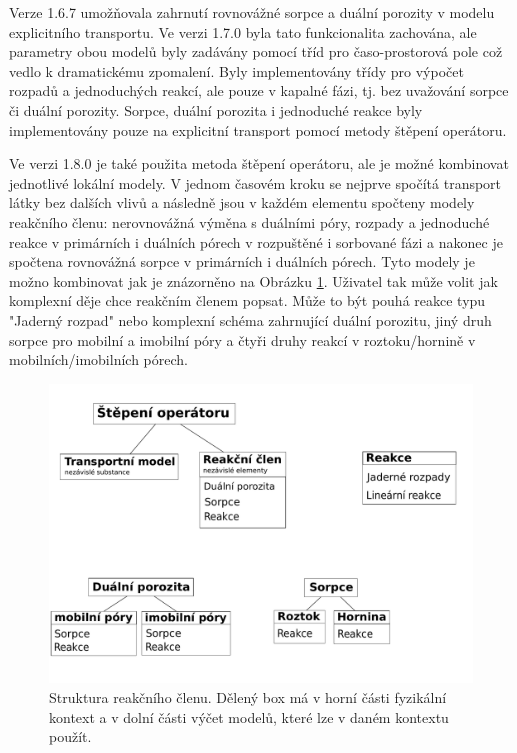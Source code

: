 Verze 1.6.7 umožňovala zahrnutí rovnovážné sorpce a duální porozity v modelu 
explicitního transportu. Ve verzi 1.7.0 byla tato funkcionalita zachována, ale 
parametry obou modelů byly zadávány pomocí tříd pro časo-prostorová pole což 
vedlo k dramatickému zpomalení. Byly implementovány třídy pro výpočet rozpadů a 
jednoduchých reakcí, ale pouze v kapalné fázi, tj. bez uvažování sorpce či 
duální porozity. Sorpce, duální porozita i jednoduché reakce byly implementovány 
pouze na explicitní transport pomocí metody štěpení operátoru. 

Ve verzi 1.8.0 je také použita metoda štěpení operátoru, ale je možné kombinovat 
jednotlivé lokální modely. V jednom časovém kroku se nejprve spočítá transport 
látky bez dalších vlivů a následně jsou v každém elementu spočteny
modely reakčního členu: nerovnovážná výměna s duálními póry, rozpady a 
jednoduché reakce v primárních i duálních pórech v rozpuštěné i sorbované fázi a 
nakonec je spočtena rovnovážná sorpce v primárních i duálních pórech. Tyto 
modely je možno kombinovat jak je znázorněno na Obrázku 
\ref{fig:reaction_term}. Uživatel tak může volit jak komplexní děje chce 
reakčním členem popsat. Může to být pouhá reakce typu "Jaderný rozpad" nebo 
komplexní schéma zahrnující duální porozitu, jiný druh sorpce pro mobilní a 
imobilní póry a čtyři druhy reakcí v roztoku/hornině v mobilních/imobilních 
pórech.

\begin{figure}[h]
 \centering
 \includegraphics[scale=0.4]{./reaction_term.pdf}
 \caption{Struktura reakčního členu. Dělený box má v horní části fyzikální 
kontext a v dolní části výčet modelů, které lze v daném kontextu použít.}
 \label{fig:reaction_term}
\end{figure}


